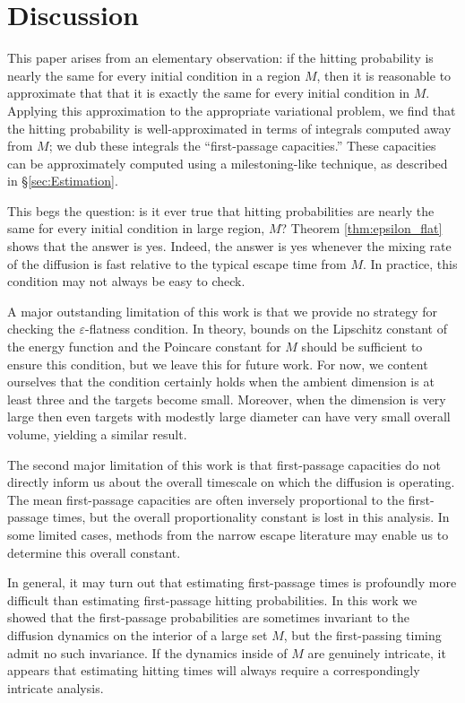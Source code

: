 \documentclass[12pt, nofootinbib,english, amsmath, amssymb, aps, priprint, graphicx,floatfix]{revtex4-1}
\theoremstyle{plain}
\theoremstyle{definition}
\theoremstyle{plain}
\begin{document}
\section{Discussion} 
\label{sec:Discussion}

This paper arises from an elementary observation: if the hitting probability is nearly the same for every initial condition in a region $M$, then it is reasonable to approximate that that it is exactly the same for every initial condition in $M$.  Applying this approximation to the appropriate variational problem, we find that the hitting probability is well-approximated in terms of integrals computed away from $M$; we dub these integrals the ``first-passage capacities.''  These capacities can be approximately computed using a milestoning-like technique, as described in \S\ref{sec:Estimation}.  

This begs the question: is it ever true that hitting probabilities are nearly the same for every initial condition in large region, $M$?  Theorem \ref{thm:epsilon_flat} shows that the answer is yes.  Indeed, the answer is yes whenever the mixing rate of the diffusion is fast relative to the typical escape time from $M$.  In practice, this condition may not always be easy to check.  

A major outstanding limitation of this work is that we provide no strategy for checking the $\varepsilon$-flatness condition.  In theory, bounds on the Lipschitz constant of the energy function and the Poincare constant for $M$ should be sufficient to ensure this condition, but we leave this for future work.  For now, we content ourselves that the condition certainly holds when the ambient dimension is at least three and the targets become small.  Moreover, when the dimension is very large then even targets with modestly large diameter can have very small overall volume, yielding a similar result.  

The second major limitation of this work is that first-passage capacities do not directly inform us about the overall timescale on which the diffusion is operating.  The mean first-passage capacities are often inversely proportional to the first-passage times, but the overall proportionality constant is lost in this analysis.  In some limited cases, methods from the narrow escape literature may enable us to determine this overall constant.

In general, it may turn out that estimating first-passage times is profoundly more difficult than estimating first-passage hitting probabilities.  In this work we showed that the first-passage probabilities are sometimes invariant to the diffusion dynamics on the interior of a large set $M$, but the first-passing timing admit no such invariance.   If the dynamics inside of $M$ are genuinely intricate, it appears that estimating hitting times will always require a correspondingly intricate analysis.  
\end{document}
